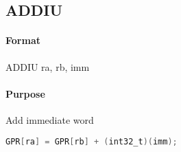 \subsection{ADDIU}


\paragraph{Format} ADDIU ra, rb, imm

\paragraph{Purpose} Add immediate word

\begin{lstlisting}[language=C]
    GPR[ra] = GPR[rb] + (int32_t)(imm);
\end{lstlisting}
